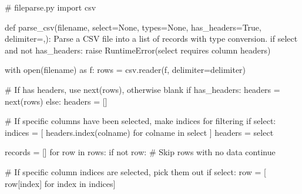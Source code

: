 \documentclass[
  letterpaper,
  DIV=11,
  numbers=noendperiod]{scrreprt}
\newenvironment{Shaded}{\begin{snugshade}}{\end{snugshade}}
\newcommand{\BuiltInTok}[1]{\textcolor[rgb]{0.00,0.46,0.62}{#1}}
\newcommand{\CommentTok}[1]{\textcolor[rgb]{0.37,0.37,0.37}{#1}}
\newcommand{\ControlFlowTok}[1]{\textcolor[rgb]{0.00,0.46,0.62}{#1}}
\newcommand{\ImportTok}[1]{\textcolor[rgb]{0.00,0.46,0.62}{#1}}
\newcommand{\KeywordTok}[1]{\textcolor[rgb]{0.00,0.46,0.62}{#1}}
\newcommand{\NormalTok}[1]{\textcolor[rgb]{0.00,0.46,0.62}{#1}}
\newcommand{\OperatorTok}[1]{\textcolor[rgb]{0.37,0.37,0.37}{#1}}
\newcommand{\PreprocessorTok}[1]{\textcolor[rgb]{0.68,0.00,0.00}{#1}}
\newcommand{\StringTok}[1]{\textcolor[rgb]{0.13,0.47,0.30}{#1}}
\newcommand{\VariableTok}[1]{\textcolor[rgb]{0.07,0.07,0.07}{#1}}
\begin{document}
\begin{Shaded}
\begin{Highlighting}[]
\CommentTok{\# fileparse.py}
\ImportTok{import}\NormalTok{ csv}

\KeywordTok{def}\NormalTok{ parse\_csv(filename, select}\OperatorTok{=}\VariableTok{None}\NormalTok{, types}\OperatorTok{=}\VariableTok{None}\NormalTok{, has\_headers}\OperatorTok{=}\VariableTok{True}\NormalTok{, delimiter}\OperatorTok{=}\StringTok{\textquotesingle{},\textquotesingle{}}\NormalTok{):}
    \CommentTok{\textquotesingle{}\textquotesingle{}\textquotesingle{}}
\CommentTok{    Parse a CSV file into a list of records with type conversion.}
\CommentTok{    \textquotesingle{}\textquotesingle{}\textquotesingle{}}
    \ControlFlowTok{if}\NormalTok{ select }\KeywordTok{and} \KeywordTok{not}\NormalTok{ has\_headers:}
        \ControlFlowTok{raise} \PreprocessorTok{RuntimeError}\NormalTok{(}\StringTok{\textquotesingle{}select requires column headers\textquotesingle{}}\NormalTok{)}
        
    \ControlFlowTok{with} \BuiltInTok{open}\NormalTok{(filename) }\ImportTok{as}\NormalTok{ f:}
\NormalTok{        rows }\OperatorTok{=}\NormalTok{ csv.reader(f, delimiter}\OperatorTok{=}\NormalTok{delimiter)}

        \CommentTok{\# If has headers, use next(rows), otherwise blank}
        \ControlFlowTok{if}\NormalTok{ has\_headers:}
\NormalTok{            headers }\OperatorTok{=} \BuiltInTok{next}\NormalTok{(rows)}
        \ControlFlowTok{else}\NormalTok{:}
\NormalTok{            headers }\OperatorTok{=}\NormalTok{ []}

        \CommentTok{\# If specific columns have been selected, make indices for filtering }
        \ControlFlowTok{if}\NormalTok{ select:}
\NormalTok{            indices }\OperatorTok{=}\NormalTok{ [ headers.index(colname) }\ControlFlowTok{for}\NormalTok{ colname }\KeywordTok{in}\NormalTok{ select ]}
\NormalTok{            headers }\OperatorTok{=}\NormalTok{ select}

\NormalTok{        records }\OperatorTok{=}\NormalTok{ []}
        \ControlFlowTok{for}\NormalTok{ row }\KeywordTok{in}\NormalTok{ rows:}
            \ControlFlowTok{if} \KeywordTok{not}\NormalTok{ row:     }\CommentTok{\# Skip rows with no data}
                \ControlFlowTok{continue}

            \CommentTok{\# If specific column indices are selected, pick them out}
            \ControlFlowTok{if}\NormalTok{ select:}
\NormalTok{                row }\OperatorTok{=}\NormalTok{ [ row[index] }\ControlFlowTok{for}\NormalTok{ index }\KeywordTok{in}\NormalTok{ indices]}


\end{Highlighting}
\end{Shaded}
\end{document}
